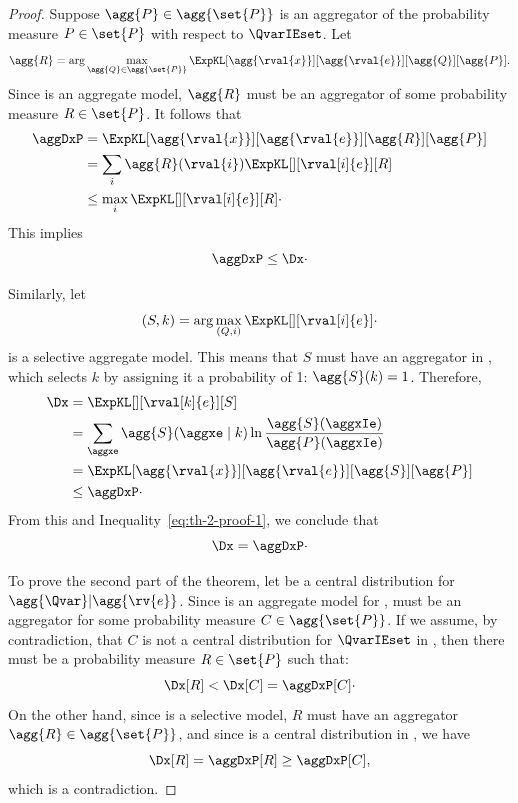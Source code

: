 \begin{proof}
    \newcommand{\aggExpKL}[1]{\ExpKL[\agg{\rval{x}}][\agg{\rval{e}}][\agg{#1}][\agg{P}]}
    Suppose $\agg{P} \in \agg{\set{P}}$ is an aggregator of the probability measure $P \in \set{P}$
    with respect to $\QvarIEset$.
    Let
    \begin{equation*}
        \agg{R} = \arg\max_{\agg{Q} \in \agg{\set{P}}} \aggExpKL{Q}.
    \end{equation*}
    Since \Magg is an aggregate model, $\agg{R}$ must be an aggregator of some probability measure $R \in \set{P}$.
    It follows that
    \begin{align*}
        \aggDxP
        &= \aggExpKL{R} \\
        &= \sum_i \agg{R}(\rval{i}) \ExpKL[][{\rval[i]{e}}][R] \\
        &\leq \max_i \ExpKL[][{\rval[i]{e}}][R] \cdot
    \end{align*}
    This implies
    \begin{equation}
        \aggDxP \leq \Dx \cdot
        \label{eq:th-2-proof-1}
    \end{equation}

    Similarly, let
    \begin{equation*}
    (S,k)
        = \arg\max_{(Q,i)} \ExpKL[][{\rval[i]{e}}] \cdot
    \end{equation*}
    \Magg is a selective aggregate model.
    This means that $S$ must have an aggregator  in \Magg, which selects $k$ by assigning it a
    probability of 1: $\agg{S}(k) = 1$.
    Therefore,
    \begin{align*}
        \Dx
        &= \ExpKL[][{\rval[k]{e}}][S] \\
        &= \sum_{\aggxe} \agg{S}(\aggxe \mid k) \ln\frac{\agg{S}(\aggxIe)}{\agg{P}(\aggxIe)} \\
        &= \aggExpKL{S} \\
        &\leq \aggDxP \cdot
    \end{align*}
    From this and Inequality~\ref{eq:th-2-proof-1}, we conclude that
    \begin{equation*}
        \Dx = \aggDxP \cdot
    \end{equation*}

    To prove the second part of the theorem, let  be a central distribution
    for $\agg{\Qvar}|\agg{\rv{e}}$.
    Since \Magg is an aggregate model for \M,  must be an aggregator for some probability
    measure $C \in \agg{\set{P}}$.
    If we assume, by contradiction, that $C$ is not a central distribution for $\QvarIEset$ in \M, then there must
    be a probability
    measure $R \in \set{P}$ such that:
    \begin{equation*}
        \Dx[R] < \Dx[C] = \aggDxP[C] \cdot
    \end{equation*}
    On the other hand, since \Magg is a selective model, $R$ must have an aggregator $\agg{R} \in \agg{\set{P}}$,
    and since  is a central distribution in \Magg, we have
    \begin{equation*}
        \Dx[R] = \aggDxP[R] \geq \aggDxP[C],
    \end{equation*}
    which is a contradiction.
\end{proof}



